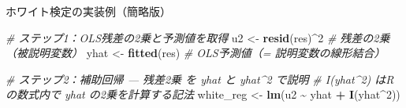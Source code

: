 \documentclass[
  ignorenonframetext,
]{beamer}
\newenvironment{Shaded}{\begin{snugshade}}{\end{snugshade}}
\newcommand{\CommentTok}[1]{\textcolor[rgb]{0.56,0.35,0.01}{\textit{#1}}}
\newcommand{\DecValTok}[1]{\textcolor[rgb]{0.00,0.00,0.81}{#1}}
\newcommand{\FunctionTok}[1]{\textcolor[rgb]{0.13,0.29,0.53}{\textbf{#1}}}
\newcommand{\NormalTok}[1]{#1}
\newcommand{\OtherTok}[1]{\textcolor[rgb]{0.56,0.35,0.01}{#1}}
\newcommand{\SpecialCharTok}[1]{\textcolor[rgb]{0.81,0.36,0.00}{\textbf{#1}}}
\begin{document}
\begin{frame}[fragile]{ホワイト検定の実装例（簡略版）}
\label{ux30dbux30efux30a4ux30c8ux691cux5b9aux306eux5b9fux88c5ux4f8bux7c21ux7565ux7248}
\footnotesize

\begin{Shaded}
\begin{Highlighting}[]
\CommentTok{\# ステップ1：OLS残差の2乗と予測値を取得}
\NormalTok{u2   }\OtherTok{\textless{}{-}} \FunctionTok{resid}\NormalTok{(res)}\SpecialCharTok{\^{}}\DecValTok{2}    \CommentTok{\# 残差の2乗（被説明変数）}
\NormalTok{yhat }\OtherTok{\textless{}{-}} \FunctionTok{fitted}\NormalTok{(res)     }\CommentTok{\# OLS予測値（= 説明変数の線形結合）}

\CommentTok{\# ステップ2：補助回帰 — 残差2乗 を yhat と yhat\^{}2 で説明}
\CommentTok{\# I(yhat\^{}2) はRの数式内で yhat の2乗を計算する記法}
\NormalTok{white\_reg }\OtherTok{\textless{}{-}} \FunctionTok{lm}\NormalTok{(u2 }\SpecialCharTok{\textasciitilde{}}\NormalTok{ yhat }\SpecialCharTok{+} \FunctionTok{I}\NormalTok{(yhat}\SpecialCharTok{\^{}}\DecValTok{2}\NormalTok{))}
\end{Highlighting}
\end{Shaded}

\normalsize
\end{frame}
\end{document}
